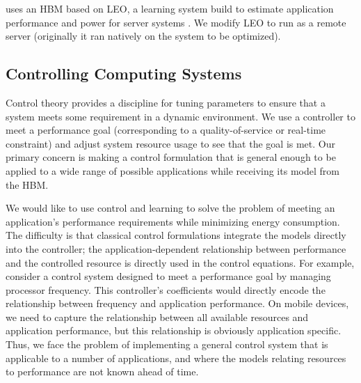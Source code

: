 


\SYSTEM{} uses an HBM based on LEO, a learning system build to
estimate application performance and power for server systems
\cite{LEO}.  We modify LEO to run as a remote server (originally it
ran natively on the system to be optimized). 





\subsection{Controlling Computing Systems}

Control theory provides a discipline for tuning parameters to ensure
that a system meets some requirement in a dynamic environment.  We use
a controller to meet a performance goal (corresponding to a
quality-of-service or real-time constraint) and adjust system resource
usage to see that the goal is met.  Our primary concern is making a
control formulation that is general enough to be applied to a wide
range of possible applications while receiving its model from the HBM.

We would like to use control and learning to solve the problem of
meeting an application's performance requirements while minimizing
energy consumption.  The difficulty is that classical control
formulations integrate the models directly into the controller; \ie
the application-dependent relationship between performance and the
controlled resource is directly used in the control equations.  For
example, consider a control system designed to meet a performance goal
by managing processor frequency.  This controller's coefficients would
directly encode the relationship between frequency and application
performance.  On mobile devices, we need to capture the relationship
between all available resources and application performance, but this
relationship is obviously application specific.  Thus, we face the
problem of implementing a general control system that is applicable to
a number of applications, and where the models relating resources to
performance are not known ahead of time.

